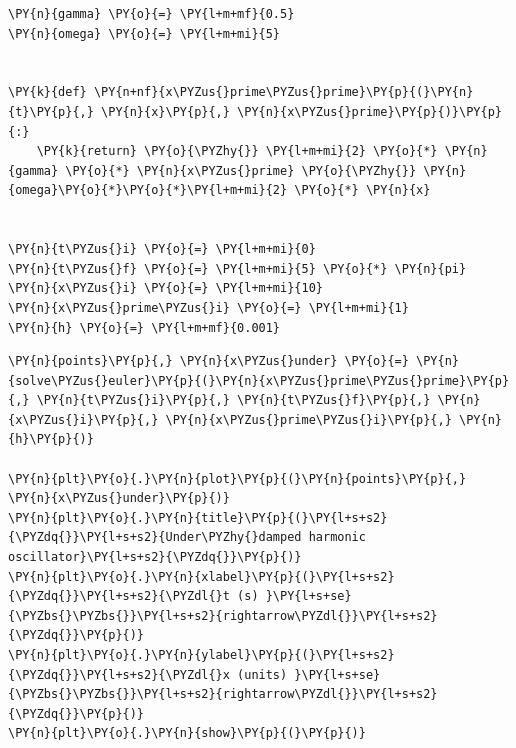     \begin{tcolorbox}[breakable, size=fbox, boxrule=1pt, pad at break*=1mm,colback=cellbackground, colframe=cellborder]
\begin{Verbatim}[commandchars=\\\{\}]
\PY{n}{gamma} \PY{o}{=} \PY{l+m+mf}{0.5}
\PY{n}{omega} \PY{o}{=} \PY{l+m+mi}{5}


\PY{k}{def} \PY{n+nf}{x\PYZus{}prime\PYZus{}prime}\PY{p}{(}\PY{n}{t}\PY{p}{,} \PY{n}{x}\PY{p}{,} \PY{n}{x\PYZus{}prime}\PY{p}{)}\PY{p}{:}
    \PY{k}{return} \PY{o}{\PYZhy{}} \PY{l+m+mi}{2} \PY{o}{*} \PY{n}{gamma} \PY{o}{*} \PY{n}{x\PYZus{}prime} \PY{o}{\PYZhy{}} \PY{n}{omega}\PY{o}{*}\PY{o}{*}\PY{l+m+mi}{2} \PY{o}{*} \PY{n}{x}


\PY{n}{t\PYZus{}i} \PY{o}{=} \PY{l+m+mi}{0}
\PY{n}{t\PYZus{}f} \PY{o}{=} \PY{l+m+mi}{5} \PY{o}{*} \PY{n}{pi}
\PY{n}{x\PYZus{}i} \PY{o}{=} \PY{l+m+mi}{10}
\PY{n}{x\PYZus{}prime\PYZus{}i} \PY{o}{=} \PY{l+m+mi}{1}
\PY{n}{h} \PY{o}{=} \PY{l+m+mf}{0.001}
\end{Verbatim}
\end{tcolorbox}

    \begin{tcolorbox}[breakable, size=fbox, boxrule=1pt, pad at break*=1mm,colback=cellbackground, colframe=cellborder]
\begin{Verbatim}[commandchars=\\\{\}]
\PY{n}{points}\PY{p}{,} \PY{n}{x\PYZus{}under} \PY{o}{=} \PY{n}{solve\PYZus{}euler}\PY{p}{(}\PY{n}{x\PYZus{}prime\PYZus{}prime}\PY{p}{,} \PY{n}{t\PYZus{}i}\PY{p}{,} \PY{n}{t\PYZus{}f}\PY{p}{,} \PY{n}{x\PYZus{}i}\PY{p}{,} \PY{n}{x\PYZus{}prime\PYZus{}i}\PY{p}{,} \PY{n}{h}\PY{p}{)}

\PY{n}{plt}\PY{o}{.}\PY{n}{plot}\PY{p}{(}\PY{n}{points}\PY{p}{,} \PY{n}{x\PYZus{}under}\PY{p}{)}
\PY{n}{plt}\PY{o}{.}\PY{n}{title}\PY{p}{(}\PY{l+s+s2}{\PYZdq{}}\PY{l+s+s2}{Under\PYZhy{}damped harmonic oscillator}\PY{l+s+s2}{\PYZdq{}}\PY{p}{)}
\PY{n}{plt}\PY{o}{.}\PY{n}{xlabel}\PY{p}{(}\PY{l+s+s2}{\PYZdq{}}\PY{l+s+s2}{\PYZdl{}t (s) }\PY{l+s+se}{\PYZbs{}\PYZbs{}}\PY{l+s+s2}{rightarrow\PYZdl{}}\PY{l+s+s2}{\PYZdq{}}\PY{p}{)}
\PY{n}{plt}\PY{o}{.}\PY{n}{ylabel}\PY{p}{(}\PY{l+s+s2}{\PYZdq{}}\PY{l+s+s2}{\PYZdl{}x (units) }\PY{l+s+se}{\PYZbs{}\PYZbs{}}\PY{l+s+s2}{rightarrow\PYZdl{}}\PY{l+s+s2}{\PYZdq{}}\PY{p}{)}
\PY{n}{plt}\PY{o}{.}\PY{n}{show}\PY{p}{(}\PY{p}{)}
\end{Verbatim}
\end{tcolorbox}

